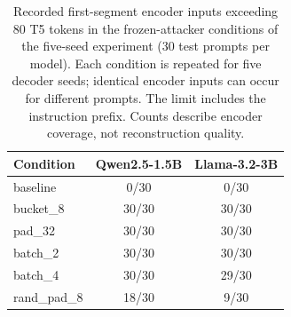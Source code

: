\begin{table}[ht]
\centering
\caption{Recorded first-segment encoder inputs exceeding 80 T5 tokens in the frozen-attacker conditions of the five-seed experiment (30 test prompts per model). Each condition is repeated for five decoder seeds; identical encoder inputs can occur for different prompts. The limit includes the instruction prefix. Counts describe encoder coverage, not reconstruction quality.}
\label{tab:encoder_coverage}
\begin{tabular}{l c c}
\toprule
Condition & Qwen2.5-1.5B & Llama-3.2-3B \\
\midrule
baseline & 0/30 & 0/30 \\
bucket\_8 & 30/30 & 30/30 \\
pad\_32 & 30/30 & 30/30 \\
batch\_2 & 30/30 & 30/30 \\
batch\_4 & 30/30 & 29/30 \\
rand\_pad\_8 & 18/30 & 9/30 \\
\bottomrule
\end{tabular}
\end{table}

\begin{table}[ht]
\centering
\caption{Partial trace ablations using logged token-byte lengths from the 96-token pilot ($n=30$ prompts per model and condition). Each run decodes up to three heuristic segments with three samples per segment, 80-token T5 input and output limits, and the full stored response as reference. Intervals are percentile-bootstrap 95\% confidence intervals for the mean.}
\label{tab:trace_controls}
\end{table}


